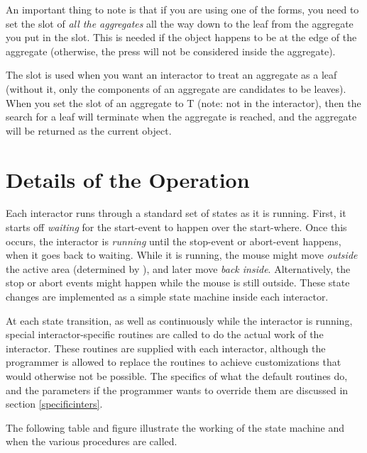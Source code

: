 An important thing to note is that if you are using one of the 
forms, you need to set the  slot of {\it all the
aggregates} all the way down to the leaf from the aggregate you put in the
 slot.  This is needed if the object happens to be at the edge
of the aggregate (otherwise, the press will not be considered inside the
aggregate).

The  slot is used when you want an interactor
to treat an aggregate as a leaf (without it, only the components of an
aggregate are candidates to be leaves).  When you set the
 slot of an aggregate to T (note: not in the
interactor), then the search
for a leaf will terminate when the aggregate is reached, and the
aggregate will be returned as the current object.


\section{Details of the Operation}
\label{operation}

Each interactor runs through a standard set of states as it is running.
First, it starts off {\it waiting} for the start-event to happen over the
start-where.  Once this occurs, the interactor is {\it running} until the
stop-event or abort-event happens, when it goes back to waiting.  While it
is running, the mouse might move {\it outside} the active area (determined by
), and later move {\it back inside}.  Alternatively, the
stop or abort events might happen while the mouse is still outside.
These state changes are implemented as a simple state machine inside each
interactor.

At each state transition, as well as continuously while the interactor is
running, special interactor-specific routines are called to do the actual
work of the interactor.  These routines are supplied with each interactor,
although the programmer is allowed to replace the routines to achieve
customizations that would otherwise not be possible.  The specifics of what
the default routines do, and the parameters if the programmer wants to
override them are discussed in section \ref{specificinters}.

The following table and figure illustrate the working of the state machine
and when the various procedures are called.

